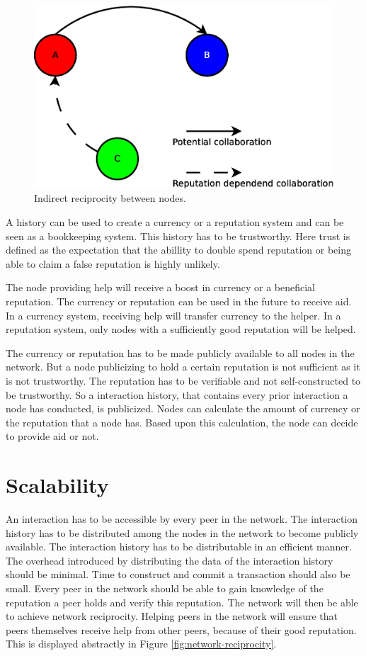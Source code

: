 \begin{figure}
	\centerline{\includegraphics[scale=0.3]{problemDescription/figs/indirect-reciprocity.eps}}
	\caption{Indirect reciprocity between nodes.}
	\label{fig:indirect-reciprocity}
\end{figure}

A history can be used to create a currency or a reputation system
and can be seen as a bookkeeping system.
This history has to be trustworthy.
Here trust is defined as the expectation that the abillity to double spend reputation
or being able to claim a false reputation is highly unlikely.

The node providing help will receive a boost in currency or a beneficial reputation.
The currency or reputation can be used in the future to receive aid.
In a currency system, receiving help will transfer currency to the helper.
In a reputation system, only nodes with a sufficiently good reputation will be helped.

The currency or reputation has to be made publicly available to all nodes in the network.
But a node publicizing to hold a certain reputation is not sufficient as it is not trustworthy.
The reputation has to be verifiable and not self-constructed to be trustworthy.
So a interaction history, that contains every prior interaction a node has conducted, is publicized.
Nodes can calculate the amount of currency or the reputation that a node has.
Based upon this calculation, the node can decide to provide aid or not.

\section{Scalability}
An interaction has to be accessible by every peer in the network.
The interaction history has to be distributed among the nodes in the network
to become publicly available.
The interaction history has to be distributable in an efficient manner.
The overhead introduced by distributing the data of the interaction history should be minimal.
Time to construct and commit a transaction should also be small.
Every peer in the network should be able to gain knowledge of the reputation a peer holds and verify this reputation.
The network will then be able to achieve network reciprocity\cite{Nowak-Cooperation}.
Helping peers in the network will ensure that peers themselves receive help from other peers,
because of their good reputation.
This is displayed abstractly in Figure \ref{fig:network-reciprocity}.

